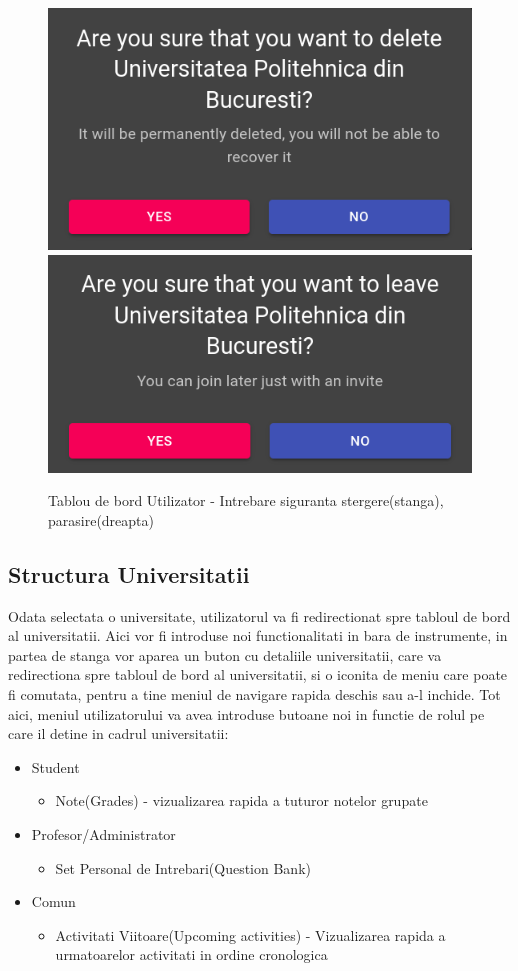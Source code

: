 \documentclass[12pt, a4paper, oneside, romanian]{teza-upb}
\begin{document}
\begin{figure}[H]
\centering
\includegraphics*[width=0.45\columnwidth]{tablou-de-bord-utilizator-intrebare-siguranta-stergere}
\includegraphics*[width=0.45\columnwidth]{tablou-de-bord-utilizator-intrebare-siguranta-parasire}
\caption{Tablou de bord Utilizator - Intrebare siguranta stergere(stanga), parasire(dreapta)}
\label{tablou-de-bord-utilizator-intrebare-siguranta}
\end{figure}

\subsection{Structura Universitatii}

Odata selectata o universitate, utilizatorul va fi redirectionat spre tabloul de bord al universitatii. Aici vor fi introduse noi functionalitati in bara de instrumente, in partea de stanga vor aparea un buton cu detaliile universitatii, care va redirectiona spre tabloul de bord al universitatii, si o iconita de meniu care poate fi comutata, pentru a tine meniul de navigare rapida deschis sau a-l inchide. Tot aici, meniul utilizatorului va avea introduse butoane noi in functie de rolul pe care il detine in cadrul universitatii:
\begin{itemize}
	\item Student
		\begin{itemize}
			\item Note(Grades) - vizualizarea rapida a tuturor notelor grupate
		\end{itemize}
	\item Profesor/Administrator
		\begin{itemize}
			\item Set Personal de Intrebari(Question Bank)
		\end{itemize}
	\item Comun
		\begin{itemize}
			\item Activitati Viitoare(Upcoming activities) - Vizualizarea rapida a urmatoarelor activitati in ordine cronologica
		\end{itemize}
\end{itemize}
\end{document}
